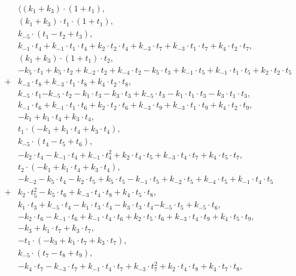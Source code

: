 \documentclass{article}
\begin{document}
\[
\begin{array}{ll}
    & \langle (k_1+k_3)\cdot(1+t_1), \\
    & (k_1+k_3)\cdot t_1\cdot(1+t_1),\\
    & {k_{-5}\cdot(t_1-t_2+t_3)},\\
    &k_{-1}\cdot t_4+k_{-1}\cdot t_1\cdot t_4+k_2\cdot t_2\cdot t_4+ k_{-3}\cdot t_7+k_{-3}\cdot t_1\cdot t_7+k_4\cdot t_2\cdot t_7,\\
   & (k_1+k_3)\cdot (1+t_1)\cdot t_2,\\
    & -k_5\cdot t_1+k_5\cdot t_2+k_{-2}\cdot t_2+k_{-4}\cdot t_2-k_5\cdot t_3+k_{-1}\cdot t_5+k_{-1}\cdot t_1\cdot t_5+k_2\cdot t_2\cdot t_5\\+&k_{-3}\cdot t_8+k_{-3}\cdot t_1\cdot t_8+k_4\cdot t_2\cdot t_8,\\
    &k_{-5}\cdot t_1{-k_{-5}\cdot t_2}-k_1\cdot t_3-k_3\cdot t_3+k_{-5}\cdot t_3-k_1\cdot t_1\cdot t_3-k_3\cdot t_1\cdot t_3,\\
    &k_{-1}\cdot t_6+k_{-1}\cdot t_1\cdot t_6+k_2\cdot t_2\cdot t_6+k_{-3}\cdot t_9+k_{-3}\cdot t_1\cdot t_9+k_4\cdot t_2\cdot t_9,\\
    & -k_1+k_1\cdot t_4+k_3\cdot t_4,\\
    & t_1\cdot (-k_1+k_1\cdot t_4+k_3\cdot t_4),\\
    &{k_{-5}\cdot (t_4-t_5+t_6)},\\
    & -k_2\cdot t_4-k_{-1}\cdot t_4+k_{-1}\cdot t_4^2+k_2\cdot t_4\cdot t_5+k_{-3}\cdot t_4\cdot t_7+k_4\cdot t_5\cdot t_7,\\
    &t_2\cdot (-k_1+k_1\cdot t_4+k_3\cdot t_4),\\
    & -k_{-2}-k_5\cdot t_4-k_2\cdot t_5+k_5\cdot t_5-k_{-1}\cdot t_5+k_{-2}\cdot t_5+k_{-4}\cdot t_5+k_{-1}\cdot t_4\cdot t_5\\+&k_2\cdot t_5^2-k_5\cdot t_6+k_{-3}\cdot t_4\cdot t_8+k_4\cdot t_5\cdot t_8,\\
    & k_1\cdot t_3+k_{-5}\cdot t_4-k_1\cdot t_3\cdot t_4-k_3\cdot t_3\cdot t_4{-k_{-5}\cdot t_5}+k_{-5}\cdot t_6,\\
    &-k_2\cdot t_6-k_{-1}\cdot t_6+k_{-1}\cdot t_4\cdot t_6+k_2\cdot t_5\cdot t_6+k_{-3}\cdot t_4\cdot t_9+k_4\cdot t_5\cdot t_9,\\
    &-k_3+k_1\cdot t_7+k_3\cdot t_7,\\
    &-t_1\cdot (-k_3+k_1\cdot t_7+k_3\cdot t_7),\\
    &{k_{-5}\cdot (t_7-t_8+t_9)},\\
    &-k_4\cdot t_7-k_{-3}\cdot t_7+k_{-1}\cdot t_4\cdot t_7+k_{-3}\cdot t_7^2+k_2\cdot t_4\cdot t_8+k_4\cdot t_7\cdot t_8,\\

\end{array}\]
\end{document}
